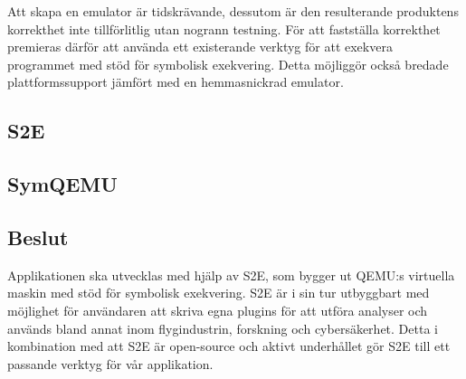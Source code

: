 






Att skapa en emulator är tidskrävande, dessutom är den resulterande produktens
korrekthet inte tillförlitlig utan nogrann testning. För att fastställa
korrekthet premieras därför att använda ett existerande verktyg för att
exekvera programmet med stöd för symbolisk exekvering. Detta möjliggör också
bredade plattformssupport jämfört med en hemmasnickrad emulator.

\subsection{S2E}


\subsection{SymQEMU}


\subsection{Beslut}


Applikationen ska utvecklas med hjälp av S2E, som bygger ut QEMU:s virtuella
maskin med stöd för symbolisk exekvering. S2E är i sin tur utbyggbart med möjlighet
för användaren att skriva egna plugins för att utföra analyser och används
bland annat inom flygindustrin, forskning och cybersäkerhet. Detta i
kombination med att S2E är open-source och aktivt underhållet gör S2E till
ett passande verktyg för vår applikation.

